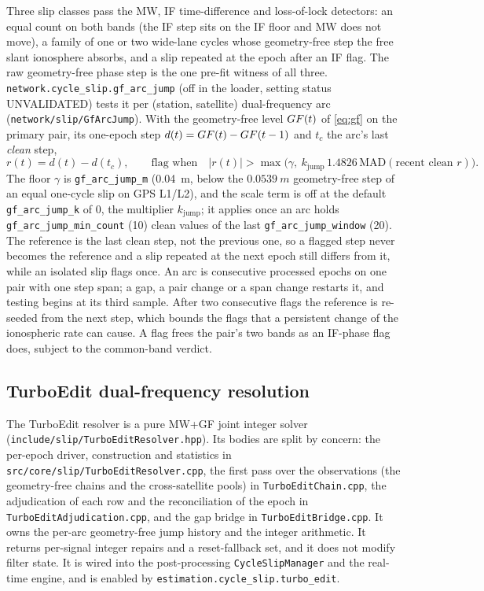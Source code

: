 \documentclass[main.tex]{subfiles}
\begin{document}
Three slip classes pass the MW, IF time-difference and loss-of-lock
detectors: an equal count on both bands (the IF step sits on the IF
floor and MW does not move), a family of one or two wide-lane cycles
whose geometry-free step the free slant ionosphere absorbs, and a slip
repeated at the epoch after an IF flag.  The raw geometry-free phase step
is the one pre-fit witness of all three.
\texttt{network.cycle\_slip.gf\_arc\_jump} (off in the loader, setting
status UNVALIDATED) tests it per (station, satellite) dual-frequency arc
(\texttt{network/slip/GfArcJump}).  With the geometry-free level
$GF(t)$ of \eqref{eq:gf} on the primary pair, its one-epoch step
$d(t) = GF(t) - GF(t-1)$ and $t_c$ the arc's last \emph{clean} step,
\begin{equation}
r(t) = d(t) - d(t_c),
\qquad
\text{flag when}\quad \lvert r(t)\rvert >
\max\bigl(\gamma,\ k_{\mathrm{jump}}\,1.4826\,\mathrm{MAD}(\text{recent clean } r)\bigr).
\label{eq:gf-arc-jump}
\end{equation}
The floor $\gamma$ is \texttt{gf\_arc\_jump\_m} (\SI{0.04}{m}, below the
$\SI{0.0539}{m}$ geometry-free step of an equal one-cycle slip on GPS L1/L2),
and the scale term is off at the default \texttt{gf\_arc\_jump\_k} of 0, the
multiplier $k_{\mathrm{jump}}$; it applies once an arc holds
\texttt{gf\_arc\_jump\_min\_count} (10) clean values of the last
\texttt{gf\_arc\_jump\_window} (20).  The
reference is the last clean step, not the previous one, so a flagged step
never becomes the reference and a slip repeated at the next epoch still
differs from it, while an isolated slip flags once.  An arc is consecutive
processed epochs on one pair with one step span; a gap, a pair change or a
span change restarts it, and testing begins at its third sample.  After two
consecutive flags the reference is re-seeded from the next step, which
bounds the flags that a persistent change of the ionospheric rate can cause.
A flag frees the pair's two bands as an IF-phase flag does, subject to the
common-band verdict.

\subsection{TurboEdit dual-frequency resolution}\label{sec:slip-turboedit}

The TurboEdit resolver is a pure MW+GF joint integer solver
(\texttt{include/slip/TurboEditResolver.hpp}).  Its bodies are split by
concern: the per-epoch driver, construction and statistics in
\texttt{src/core/slip/TurboEditResolver.cpp}, the first pass over the
observations (the geometry-free chains and the cross-satellite pools) in
\texttt{TurboEditChain.cpp}, the adjudication of each row and the
reconciliation of the epoch in \texttt{TurboEditAdjudication.cpp}, and the
gap bridge in \texttt{TurboEditBridge.cpp}.  It owns the per-arc
geometry-free jump history and the integer arithmetic.  It returns
per-signal integer repairs and a reset-fallback set, and it does not
modify filter state.  It is wired into the post-processing
\texttt{CycleSlipManager} and the real-time engine, and is enabled by
\texttt{estimation.cycle\_slip.turbo\_edit}.
\end{document}
